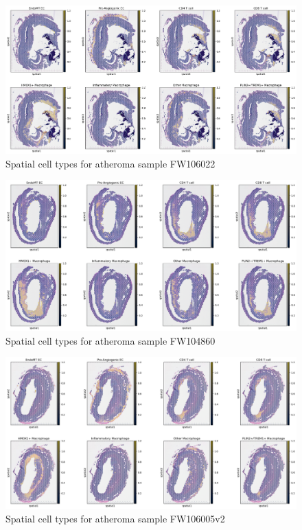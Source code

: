 \documentclass[a4paper,12pt]{article}
\begin{document}
\begin{figure}[h]
    \centering
    \includegraphics[width=1.1\textwidth]{spatialAtheroma1}
    \caption{Spatial cell types for atheroma sample FW106022}
    \label{fig:appendix1}
\end{figure}
\begin{figure}[h]
    \centering
    \includegraphics[width=1.1\textwidth]{spatialAtheroma2}
    \caption{Spatial cell types for atheroma sample FW104860}
    \label{fig:appendix1}
\end{figure}
\begin{figure}[h]
    \centering
    \includegraphics[width=1.1\textwidth]{spatialAtheroma3}
    \caption{Spatial cell types for atheroma sample FW106005v2}
    \label{fig:appendix1}
\end{figure}
\end{document}
